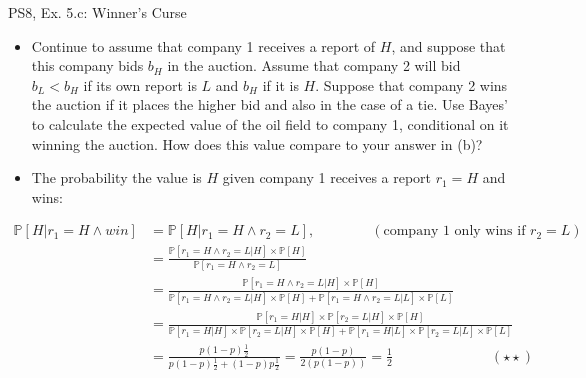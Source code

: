 \begin{frame}{PS8, Ex. 5.c: Winner's Curse}
      \begin{itemize}
        \item[(c)] Continue to assume that company 1 receives a report of $H$, and suppose that this company bids $b_H$ in the auction. Assume that company 2 will bid $b_L < b_H$ if its own report is $L$ and $b_H$ if it is $H$. Suppose that company 2 wins the auction if it places the higher bid and also in the case of a tie. Use Bayes’ to calculate the expected value of the oil field to company 1, conditional on it winning the auction. How does this value compare to your answer in (b)?
        \item[Step 1:] The probability the value is $H$ given company 1 receives a report $r_1=H$ and wins:
        \end{itemize}
        \vspace{-8pt}
        \begin{align*}
            \mathbb{P}[H|r_1=H\wedge win]&=\mathbb{P}[H|r_1=H\wedge r_2=L],\quad\quad\quad\quad(\text{company 1 only wins if }r_2=L)\\
            &=\frac{\mathbb{P}[r_1=H\wedge r_2=L|H]\times\mathbb{P}[H]}{\mathbb{P}[r_1=H\wedge r_2=L]}&\\
            &=\frac{\mathbb{P}[r_1=H\wedge r_2=L|H]\times\mathbb{P}[H]}{\mathbb{P}[r_1=H\wedge r_2=L|H]\times\mathbb{P}[H]+\mathbb{P}[r_1=H\wedge r_2=L|L]\times\mathbb{P}[L]}&\\
            &=\frac{\mathbb{P}[r_1=H|H]\times\mathbb{P}[r_2=L|H]\times\mathbb{P}[H]}{\mathbb{P}[r_1=H|H]\times\mathbb{P}[r_2=L|H]\times\mathbb{P}[H]+\mathbb{P}[r_1=H|L]\times\mathbb{P}[r_2=L|L]\times\mathbb{P}[L]}&\\
            &=\frac{p(1-p)\frac{1}{2}}{p(1-p)\frac{1}{2}+(1-p)p\frac{1}{2}}=\frac{p(1-p)}{2(p(1-p))}=\frac{1}{2}\quad\quad\quad\quad\quad\quad\quad(\star\star)
        \end{align*}
      \vfill\null
\end{frame}
